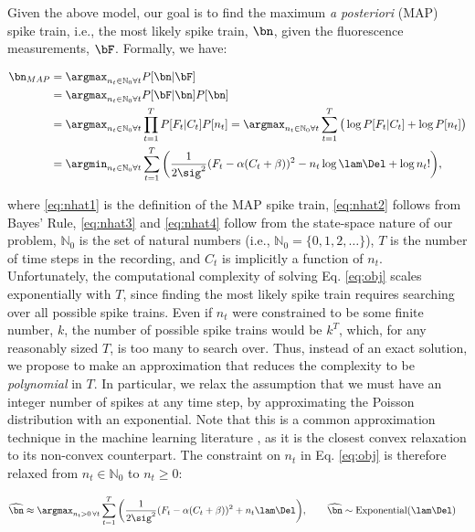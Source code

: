 Given the above model, our goal is to find the maximum \emph{a posteriori} (MAP) spike train, i.e., the most likely spike train, $\bn$,  given the fluorescence measurements, $\bF$. Formally, we have:

\begin{subequations}  \label{eq:obj}
\begin{align}
\bn_{MAP}
&=  \anx P[\bn | \bF] \label{eq:nhat1} \\
&= \anx P[\bF | \bn] P[\bn]  \label{eq:nhat2} \\
&= \argmax_{n_t \in \mathbb{N}_0 \forall t} \prod_{t=1}^T  P[F_t | C_t]  P[n_t] 
= \argmax_{n_t \in \mathbb{N}_0 \forall t} \sum_{t=1}^T \big( \log P[F_t | C_t] + \log P[n_t]\big)  \label{eq:nhat3} \\
&= \ann  \sum_{t=1}^T \bigg( \frac{1}{2 \sig^2}(F_t - \alpha(C_t + \beta))^2  -  n_t \log \lam \Del + \log n_t! \bigg), \label{eq:nhat4}   
\end{align} 
\end{subequations}

\noindent where \ref{eq:nhat1} is the definition of the MAP spike train, \ref{eq:nhat2} follows from Bayes' Rule, \ref{eq:nhat3} and \ref{eq:nhat4} follow from the state-space nature of our problem, $\mathbb{N}_0$ is the set of natural numbers (i.e., $\mathbb{N}_0 = \{0, 1, 2, \ldots\}$), $T$ is the number of time steps in the recording, and $C_t$ is implicitly a function of $n_t$.  Unfortunately, the computational complexity of solving Eq. \eqref{eq:obj} scales exponentially with $T$, since finding the most likely spike train requires searching over all possible spike trains.  Even if $n_t$ were constrained to be some finite number, $k$, the number of possible spike trains would be $k^T$, which, for any reasonably sized $T$, is too many to search over.  Thus, instead of an exact solution, we propose to make an approximation that reduces the complexity to be \emph{polynomial} in $T$. In particular, we relax the assumption that we must have an integer number of spikes at any time step, by approximating the Poisson distribution with an exponential. Note that this is a common approximation technique in the machine learning literature \cite{HastieFriedman01}, as it is the closest convex relaxation to its non-convex counterpart. The constraint on $n_t$ in Eq. \eqref{eq:obj} is therefore relaxed from  $n_t \in \mathbb{N}_0$ to $n_t \geq 0$:

\begin{align} \label{eq:obj2}
\hnm &\approx \argmax_{n_t>0 \, \forall t}  \sum_{t=1}^T \bigg( \frac{1}{2 \sig^2}(F_t - \alpha(C_t + \beta))^2  + n_t \lam \Del \bigg), \qquad \hnm \sim \text{Exponential}(\lam \Del) %
\end{align}

